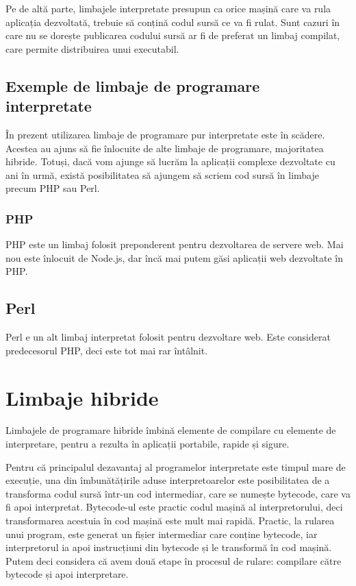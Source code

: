 Pe de altă parte, limbajele interpretate presupun ca orice mașină care va rula
aplicația dezvoltată, trebuie să conțină codul sursă ce va fi rulat. Sunt cazuri
în care nu se dorește publicarea codului sursă ar fi de preferat un limbaj
compilat, care permite distribuirea unui executabil.

\subsection{Exemple de limbaje de programare interpretate}
\label{sec:appdev-langs-int-ex}

În prezent utilizarea limbaje de programare pur interpretate este în scădere.
Acestea au ajuns să fie înlocuite de alte limbaje de programare, majoritatea
hibride. Totuși, dacă vom ajunge să lucrăm la aplicații complexe dezvoltate cu
ani în urmă, există posibilitatea să ajungem să scriem cod sursă în limbaje
precum PHP sau Perl.

\subsubsection{PHP}
\label{sec:appdev-langs-int-ex-php}

PHP este un limbaj folosit preponderent pentru dezvoltarea de servere web. Mai
nou este înlocuit de Node.js, dar încă mai putem găsi aplicații web dezvoltate
în PHP.

\subsection{Perl}
\label{sec:appdev-langs-int-ex-perl}

Perl e un alt limbaj interpretat folosit pentru dezvoltare web. Este considerat
predecesorul PHP, deci este tot mai rar întâlnit.

\section{Limbaje hibride}
\label{sec:appdev-langs-hybrid}

Limbajele de programare hibride îmbină elemente de compilare cu elemente de
interpretare, pentru a rezulta în aplicații portabile, rapide și sigure.

Pentru că principalul dezavantaj al programelor interpretate este timpul mare de
execuție, una din îmbunătățirile aduse interpretoarelor este posibilitatea de a
transforma codul sursă într-un cod intermediar, care se numește bytecode, care
va fi apoi interpretat. Bytecode-ul este practic codul mașină al
interpretorului, deci transformarea acestuia în cod mașină este mult mai rapidă.
Practic, la rularea unui program, este generat un fișier intermediar care
conține bytecode, iar interpretorul ia apoi instrucțiuni din bytecode și le
transformă în cod mașină. Putem deci considera că avem două etape în procesul de
rulare: compilare către bytecode și apoi interpretare.

